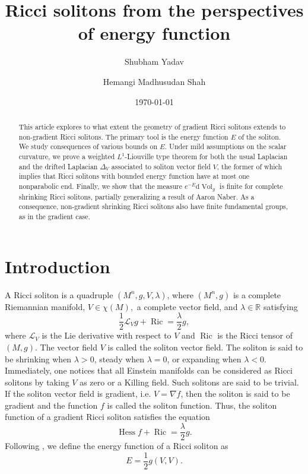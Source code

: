 \documentclass{amsart}
\title{Ricci solitons from the perspectives of energy function}
\author{Shubham Yadav \orcidlink{0000-0002-3906-5739}}
\author{Hemangi Madhusudan Shah \orcidlink{0000-0002-2665-5094}}
\date{\today}
\newcommand{\lie}[1]{\mathcal{L}_{#1}}
\newcommand{\derivative}{\mathrm{d}}
\DeclareMathOperator*{\ricci}{Ric}
\DeclareMathOperator*{\hessian}{Hess}
\DeclareMathOperator*{\Vol}{Vol}
\theoremstyle{plain}
\theoremstyle{plain}
\theoremstyle{plain}
\theoremstyle{plain}
\theoremstyle{remark}
\begin{document}
\begin{abstract}
This article explores to what extent the geometry of gradient Ricci solitons extends to non-gradient Ricci solitons. 
The primary tool is the energy function $E$ of the soliton. 
We study consequences of various bounds on $E$. 
Under mild assumptions on the scalar curvature, we prove a weighted $L^1$-Liouville type theorem for both the usual Laplacian and the drifted Laplacian $\Delta_V$ associated to soliton vector field $V$, the former of which implies that Ricci solitons with bounded energy function have at most one nonparabolic end. 
Finally, we show that the measure $e^{-E} \derivative{\Vol_{g}}$ is finite for complete shrinking Ricci solitons, partially generalizing a result of Aaron Naber. 
As a consequence, non-gradient shrinking Ricci solitons also have finite fundamental groups, as in the gradient case.
\end{abstract}


\maketitle
\newpage

\tableofcontents 



\section{Introduction}
A Ricci soliton is a quadruple $(M^n,g,V,\lambda)$, where $(M^n,g)$ is a complete Riemannian manifold, $V \in \chi (M),$ a complete vector field, and $\lambda \in \mathbb{R} $ satisfying
\begin{equation}\label{eqn: Ricci Soliton equation}
    \frac{1}{2} \lie{V} g + \ricci = \frac{\lambda}{2} g,
\end{equation}
where $\lie{V}$ is the Lie derivative with respect to $V$ and $\ricci$ is the Ricci tensor of $(M,g)$. 
The vector field $V$ is called the soliton vector field.
The soliton is said to be shrinking when $\lambda>0$, steady when $\lambda = 0$, or expanding when $\lambda<0$. 
Immediately, one notices that all Einstein manifolds can be considered as Ricci solitons by taking $V$ as zero or a Killing field.
Such solitons are said to be trivial.
If the soliton vector field is gradient, i.e. $V = \nabla f$, then the soliton is said to be gradient and the function $f$ is called the soliton function. 
Thus, the soliton function of a gradient Ricci soliton satisfies the equation
\begin{equation}
	\hessian f + \ricci = \frac{\lambda}{2} g.
\end{equation}
Following \cite{sym12020289}, we define the energy function of a Ricci soliton as
\begin{equation}
    E = \frac{1}{2} g(V,V).
\end{equation}
\end{document}
